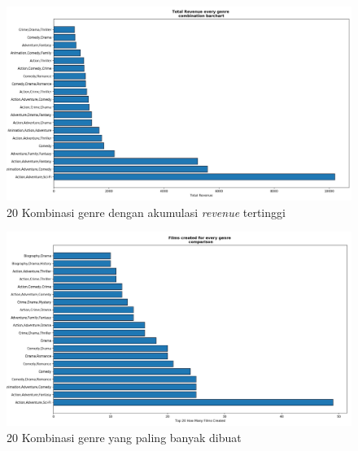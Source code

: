 \begin{figure}[H]
	\centering  
	\includegraphics[scale=0.4]{./Lampiran/gambar/top20_genrecluster_totalRevenue_barchart}   
	\caption{20 Kombinasi genre dengan akumulasi \textit{revenue} tertinggi}
	\label{fig:top20_genrecluster_totalRevenue_barchart} 
\end{figure} 



\begin{figure}[H]
	\centering  
	\includegraphics[scale=0.4]{./Lampiran/gambar/top20genrecluster_combinationtitle_barchart}   
	\caption{20 Kombinasi genre yang paling banyak dibuat}
	\label{fig:top20genrecluster_combinationtitle_barchart} 
\end{figure} 

